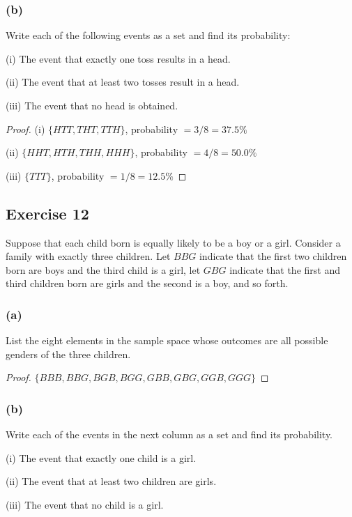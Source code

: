 \documentclass[14pt]{extarticle}
\begin{document}
\subsubsection{(b)}
Write each of the following events as a set and find its probability:

(i) The event that exactly one toss results in a head.

(ii) The event that at least two tosses result in a head.

(iii) The event that no head is obtained.

\begin{proof}
(i) \(\{HTT, THT, TTH\}\), probability \(= 3/8 = 37.5\%\)

(ii) \(\{HHT, HTH, THH, HHH\}\), probability \(= 4/8 = 50.0\%\)

(iii) \(\{TTT\}\), probability \(= 1/8 = 12.5\%\)
\end{proof}

\subsection{Exercise 12}
Suppose that each child born is equally likely to be a boy or a girl. Consider a family with exactly three children. 
Let \(BBG\) indicate that the first two children born are boys and the third child is a girl, let \(GBG\) indicate 
that the first and third children born are girls and the second is a boy, and so forth.

\subsubsection{(a)}
List the eight elements in the sample space whose outcomes are all possible genders of the three children.

\begin{proof}
\(\{BBB, BBG, BGB, BGG, GBB, GBG, GGB, GGG\}\)
\end{proof}

\subsubsection{(b)}
Write each of the events in the next column as a set and find its probability.

(i) The event that exactly one child is a girl.

(ii) The event that at least two children are girls.

(iii) The event that no child is a girl.
\end{document}
